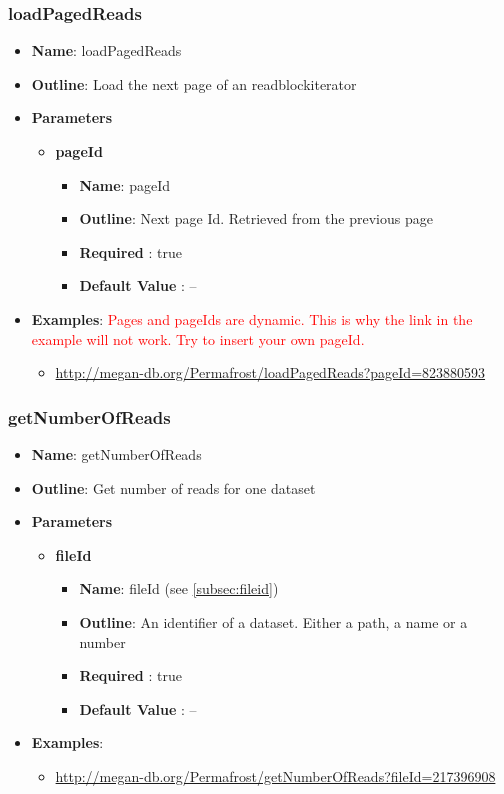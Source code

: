 \documentclass[11pt]{article}
\begin{document}
\subsubsection{loadPagedReads}

\begin{itemize}
	\item \textbf{Name}: loadPagedReads
	\item \textbf{Outline}: Load the next page of an readblockiterator
	\item \textbf{Parameters}
		\begin{itemize}
			\item \textbf{pageId}		
				\begin{itemize}
					\item \textbf{Name}: pageId
					\item \textbf{Outline}: Next page Id. Retrieved from the previous page
					\item \textbf{Required} : true
					\item \textbf{Default Value} : --
				\end{itemize}
		\end{itemize}
	\item \textbf{Examples}: \textcolor{red}{Pages and pageIds are dynamic. This is why the link in the example will not work. Try to insert your own pageId.}
		\begin{itemize}		
			\item \url{http://megan-db.org/Permafrost/loadPagedReads?pageId=823880593}
		\end{itemize}
\end{itemize}


\subsubsection{getNumberOfReads}

\begin{itemize}
	\item \textbf{Name}: getNumberOfReads
	\item \textbf{Outline}: Get number of reads for one dataset
	\item \textbf{Parameters}
		\begin{itemize}
			\item \textbf{fileId}		
				\begin{itemize}
					\item \textbf{Name}: fileId (see \ref{subsec:fileid})
					\item \textbf{Outline}: An identifier of a dataset. Either a path, a name or a number
					\item \textbf{Required} : true
					\item \textbf{Default Value} : --
				\end{itemize}
		\end{itemize}
	\item \textbf{Examples}:
		\begin{itemize}		
			\item \url{http://megan-db.org/Permafrost/getNumberOfReads?fileId=217396908}
		\end{itemize}
\end{itemize}
\end{document}
